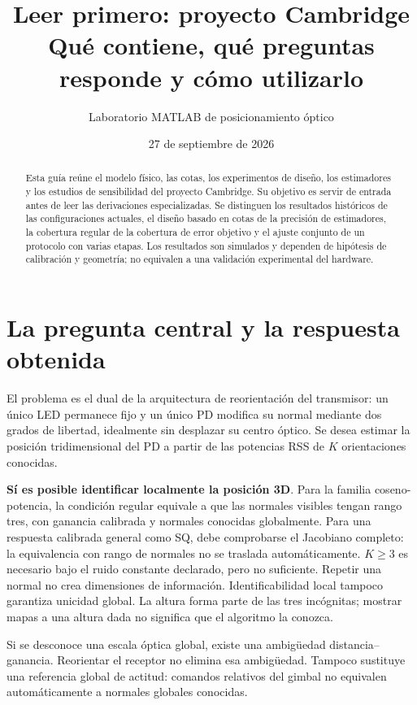 \documentclass[11pt,a4paper]{article}
\title{Leer primero: proyecto Cambridge\\\large Qué contiene, qué preguntas responde y cómo utilizarlo}
\author{Laboratorio MATLAB de posicionamiento óptico}
\date{27 de septiembre de 2026}
\begin{document}
\maketitle
\begin{abstract}
Esta guía reúne el modelo físico, las cotas, los experimentos de diseño, los estimadores y los estudios de sensibilidad del proyecto Cambridge. Su objetivo es servir de entrada antes de leer las derivaciones especializadas. Se distinguen los resultados históricos de las configuraciones actuales, el diseño basado en cotas de la precisión de estimadores, la cobertura regular de la cobertura de error objetivo y el ajuste conjunto de un protocolo con varias etapas. Los resultados son simulados y dependen de hipótesis de calibración y geometría; no equivalen a una validación experimental del hardware.
\end{abstract}
\tableofcontents
\clearpage

\section{La pregunta central y la respuesta obtenida}
El problema es el dual de la arquitectura de reorientación del transmisor: un único LED permanece fijo y un único PD modifica su normal mediante dos grados de libertad, idealmente sin desplazar su centro óptico. Se desea estimar la posición tridimensional del PD a partir de las potencias RSS de $K$ orientaciones conocidas.

\textbf{Sí es posible identificar localmente la posición 3D}. Para la familia coseno-potencia, la condición regular equivale a que las normales visibles tengan rango tres, con ganancia calibrada y normales conocidas globalmente. Para una respuesta calibrada general como SQ, debe comprobarse el Jacobiano completo: la equivalencia con rango de normales no se traslada automáticamente. $K\geq3$ es necesario bajo el ruido constante declarado, pero no suficiente. Repetir una normal no crea dimensiones de información. Identificabilidad local tampoco garantiza unicidad global. La altura forma parte de las tres incógnitas; mostrar mapas a una altura dada no significa que el algoritmo la conozca.

Si se desconoce una escala óptica global, existe una ambigüedad distancia--ganancia. Reorientar el receptor no elimina esa ambigüedad. Tampoco sustituye una referencia global de actitud: comandos relativos del gimbal no equivalen automáticamente a normales globales conocidas.
\end{document}
